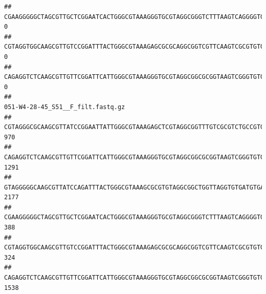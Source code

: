 \documentclass[]{article}
\begin{document}
\begin{verbatim}
## CGAAGGGGGCTAGCGTTGCTCGGAATCACTGGGCGTAAAGGGTGCGTAGGCGGGTCTTTAAGTCAGGGGTGAAATCCTGGAGCTCAACTCCAGAACTGCCTTTGATACTGAAGATCTTGAGTTCGGGAGAGGTGAGTGGAACTGCGAGTGTAGAGGTGAAATTCGTAGATATTCGCAAGAACACCAGTGGCGAAGGCGGCTCACTGGCCCGATACTGACGCTGAGGCACGAAAGCGTGGGGAGCAAACA                                0
## CGTAGGTGGCAAGCGTTGTCCGGATTTACTGGGCGTAAAGAGCGCGCAGGCGGTCGTTCAAGTCGCGTGTGAAAGCCCCCGGCTCAACTGGGGAGGGTCACGCGATACTGATCGACTCGAAGGCAGGAGAGGGTAGTGGAATTCCCGGTGTAGTGGTGAAATGCGTAGATATCGGGAGGAACACCAGTGGCGAAGGCGACTACCTGGCCTGTTCTTGACGCTGAGGCGCGAAAGCTAGGGGAGCAAACG                                0
## CAGAGGTCTCAAGCGTTGTTCGGATTCATTGGGCGTAAAGGGTGCGTAGGCGGCGCGGTAAGTCGGGTGTGAAATCTCGGGGCTTAACTCCGAAACTGCATTCGATACTGCCGTGCTTGAGGACTGGAGAGGAGACTGGAATTTACGGTGTAGCGGTGAAATGCGTAGATATCGTAAGGAAGACCAGTGGCGAAGGCGGGTCTCTGGACAGTTCCTGACGCTGAGGCACGAAGGCCAGGGGAGCAAACG                                0
##                                                                                                                                                                                                                                                           051-W4-28-45_S51__F_filt.fastq.gz
## CGTAGGGCGCAAGCGTTATCCGGAATTATTGGGCGTAAAGAGCTCGTAGGCGGTTTGTCGCGTCTGCCGTGAAAGTCCGGGGCTCAACTCCGGATCTGCGGTGGGTACGGGCAGACTAGAGTGATGTAGGGGAGACTGGAATTCCTGGTGTAGCGGTGAAATGCGCAGATATCAGGAGGAACACCGATGGCGAAGGCAGGTCTCTGGGCATTAACTGACGCTGAGGAGCGAAAGCATGGGGAGCGAACA                               970
## CAGAGGTCTCAAGCGTTGTTCGGATTCATTGGGCGTAAAGGGTGCGTAGGCGGCGCGGTAAGTCGGGTGTGAAATCTCGGAGCTTAACTCCGAAACTGCATTCGATACTGCCGTGCTTGAGGACTGGAGAGGAGACTGGAATTTACGGTGTAGCGGTGAAATGCGTAGATATCGTAAGGAAGACCAGTGGCGAAGGCGGGTCTCTGGACAGTTCCTGACGCTGAGGCACGAAGGCCAGGGGAGCAAACG                              1291
## GTAGGGGGCAAGCGTTATCCAGATTTACTGGGCGTAAAGCGCGTGTAGGCGGCTGGTTAGGTGTGATGTGAAATCTTCCGGCTCAACCGGAAAACTGCATTGCAAACCGGCCTGGCTAGAGTGCAGGAGAGGGAAGCGGAATTCCAGGTGTAGCGGTGAAATGCGTAGATATCTGGAGGAACACCAGTGGCGAAGGCGGCTTCCTGGCCTGCAACTGACGCTGAGACGCGAAAGCGTGGGGAGCGAAC                               2177
## CGAAGGGGGCTAGCGTTGCTCGGAATCACTGGGCGTAAAGGGTGCGTAGGCGGGTCTTTAAGTCAGGGGTGAAATCCTGGAGCTCAACTCCAGAACTGCCTTTGATACTGAAGATCTTGAGTTCGGGAGAGGTGAGTGGAACTGCGAGTGTAGAGGTGAAATTCGTAGATATTCGCAAGAACACCAGTGGCGAAGGCGGCTCACTGGCCCGATACTGACGCTGAGGCACGAAAGCGTGGGGAGCAAACA                               388
## CGTAGGTGGCAAGCGTTGTCCGGATTTACTGGGCGTAAAGAGCGCGCAGGCGGTCGTTCAAGTCGCGTGTGAAAGCCCCCGGCTCAACTGGGGAGGGTCACGCGATACTGATCGACTCGAAGGCAGGAGAGGGTAGTGGAATTCCCGGTGTAGTGGTGAAATGCGTAGATATCGGGAGGAACACCAGTGGCGAAGGCGACTACCTGGCCTGTTCTTGACGCTGAGGCGCGAAAGCTAGGGGAGCAAACG                               324
## CAGAGGTCTCAAGCGTTGTTCGGATTCATTGGGCGTAAAGGGTGCGTAGGCGGCGCGGTAAGTCGGGTGTGAAATCTCGGGGCTTAACTCCGAAACTGCATTCGATACTGCCGTGCTTGAGGACTGGAGAGGAGACTGGAATTTACGGTGTAGCGGTGAAATGCGTAGATATCGTAAGGAAGACCAGTGGCGAAGGCGGGTCTCTGGACAGTTCCTGACGCTGAGGCACGAAGGCCAGGGGAGCAAACG                              1538

\end{verbatim}
\end{document}

